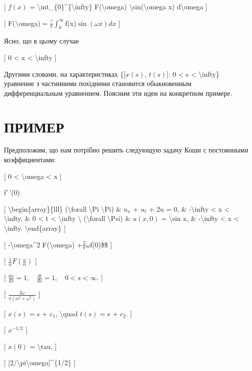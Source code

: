 \documentclass[
]{article}
\begin{document}
{{{[} \(f(x)\) = \textbackslash int\_\{0\}\^{}\{\textbackslash infty\}
F(\textbackslash omega) \textbackslash sin(\textbackslash omega x)
d\textbackslash omega {]}

{[}
F(\textbackslash omega)\(= \frac{?}{\pi} \int_{0}^{\infty}\)f(x)\(\sin(\omega x) dx\)
{]}

Ясно, що в цьому случае

{[} 0 \textless{} x \textless{} \textbackslash infty {]}

Другими словами, на характеристиках \{{[}\(x(s)\), \(t(s)\){]}: 0
\textless{} s \textless{} \textbackslash infty\} уравнение з частинними
похідними становится обыкновенным дифференциальным уравнением. Поясним
эти идеи на конкретном примере.

\section{ПРИМЕР}\label{ux43fux440ux438ux43cux435ux440}

Предположим, що нам потрібно решить следующую задачу Коши с постоянными
коэффициентами:

{[} 0 \textless{} \textbackslash omega \textless{} x {]}

f'\,'(0)

{[} \textbackslash begin\{array\}\{lll\} (\textbackslash forall
\textbackslash Pi \textbackslash Pi) \& \(u_x\) + \(u_t\) + 2u = 0, \&
-\textbackslash infty \textless{} x \textless{} \textbackslash infty, \&
0 \textless{} t \textless{} \textbackslash infty \textbackslash{}
(\textbackslash forall \textbackslash Psi) \& \(u(x, 0)\) =
\textbackslash sin x, \& -\textbackslash infty \textless{} x \textless{}
\textbackslash infty. \textbackslash end\{array\} {]}

{[} -\textbackslash omega\^{}2 F(\textbackslash omega)
+\(\frac{2}{\pi} \omega\)f(0)\$\$ {]}

{[} \(\frac{1}{\alpha} F\left(\frac{\omega}{\alpha}\right)\) {]}

{[}
\(\frac{dx}{ds} = 1, \quad \frac{dt}{ds} = 1, \quad 0 < s < \infty\).
{]}

{[} \(\frac{2\omega}{\pi (\alpha^2 + \omega^2)}\) {]}

{[} \(x(s)\) = s + \(c_1\), \textbackslash quad \(t(s)\) = s + \(c_2\).
{]}

{[} \(x^{-1/2}\) {]}

{[} \(x(0)\) = \textbackslash tau, {]}

{[} {[}2/\textbackslash pi\textbackslash omega{]}\^{}\{1/2\} {]}

}}
\end{document}
